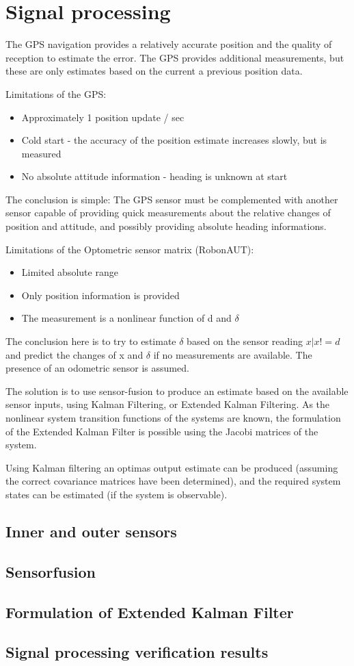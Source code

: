 \section{Signal processing}

The GPS navigation provides a relatively accurate position and the quality of reception to estimate the error. The GPS provides additional measurements, but these are only estimates based on the current a previous position data.

Limitations of the GPS:
\begin{itemize}
\item Approximately 1 position update / sec
\item Cold start - the accuracy of the position estimate increases slowly, but is measured
\item No absolute attitude information - heading is unknown at start
\end{itemize}

The conclusion is simple: The GPS sensor must be complemented with another sensor capable of providing quick measurements about the relative changes of position and attitude, and possibly providing absolute heading informations.

Limitations of the Optometric sensor matrix (RobonAUT):
\begin{itemize}
\item Limited absolute range
\item Only position information is provided
\item The measurement is a nonlinear function of d and $\delta$
\end{itemize}

The conclusion here is to try to estimate $\delta$ based on the sensor reading $x | x!=d$ and predict the changes of x and $\delta$ if no measurements are available. The presence of an odometric sensor is assumed.

The solution is to use sensor-fusion to produce an estimate based on the available sensor inputs, using Kalman Filtering, or Extended Kalman Filtering.
As the nonlinear system transition functions of the systems are known, the formulation of the Extended Kalman Filter is possible using the Jacobi matrices of the system.

Using Kalman filtering an optimas output estimate can be produced (assuming the correct covariance matrices have been determined), and the required system states can be estimated (if the system is observable).

\subsection{Inner and outer sensors}

\subsection{Sensorfusion}

\subsection{Formulation of Extended Kalman Filter}

\subsection{Signal processing verification results}